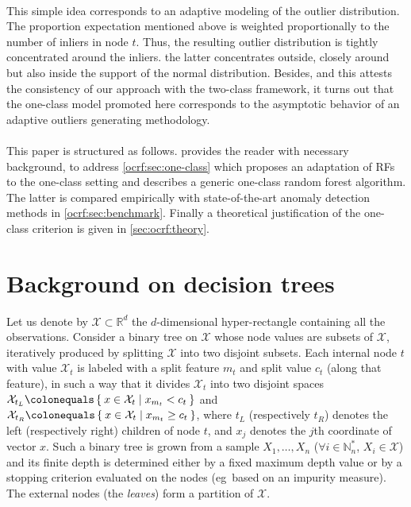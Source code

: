 \paragraph{}
This simple idea corresponds to an adaptive modeling of the outlier
distribution.  The proportion expectation mentioned above is weighted
proportionally to the number of inliers in node $t$. Thus, the resulting
outlier distribution is tightly concentrated around the inliers. %
the latter concentrates outside, closely around but also inside the support of
the normal distribution.
%
Besides, and this attests the consistency of our approach with the two-class
framework, it turns out that the one-class model promoted here corresponds to
the asymptotic behavior of an adaptive %
outliers generating methodology.
\paragraph{}
This paper is structured as follows.  provides the
reader with necessary background, to address \cref{ocrf:sec:one-class} which
proposes an adaptation of \acp{RF} to the one-class setting and describes a
generic one-class random forest algorithm. The latter is compared empirically
with state-of-the-art anomaly detection methods in \cref{ocrf:sec:benchmark}.
Finally a theoretical justification of the one-class criterion is given in
\cref{sec:ocrf:theory}.

\section{Background on decision trees}
\label{ocrf:sec:background}
Let us denote by $\mathcal{X} \subset \mathbb{R}^d$ the $d$-dimensional
hyper-rectangle containing all the observations.  Consider a binary tree on
$\mathcal{X}$ whose node values are subsets of $\mathcal{X}$, iteratively
produced by splitting $\mathcal{X}$ into two disjoint subsets.  Each internal
node $t$ with value $\mathcal{X}_t$ is labeled with a split feature $m_t$ and
split value $c_t$ (along that feature), in such a way that it divides
$\mathcal{X}_t$ into two disjoint spaces $\mathcal{X}_{t_L} \colonequals \Set{x
\in \mathcal{X}_t | x_{m_t} < c_t}$ and $\mathcal{X}_{t_R} \colonequals \Set{x
\in \mathcal{X}_t | x_{m_t} \ge c_t}$, where $t_L$ (respectively $t_R$) denotes
the left (respectively right) children of node $t$, and $x_j$ denotes the $j$th
coordinate of vector $x$. Such a binary tree is grown from a sample $ X_1,
\ldots,  X_n$ ($\forall i\in\mathbb{N}_n^*$, $ X_i \in \mathcal{X}$) and its
finite depth is determined either by a fixed maximum depth value or by a
stopping criterion evaluated on the nodes (\acs{eg}~based on an impurity
measure).  The external nodes (the \emph{leaves}) form a partition of
$\mathcal{X}$.
